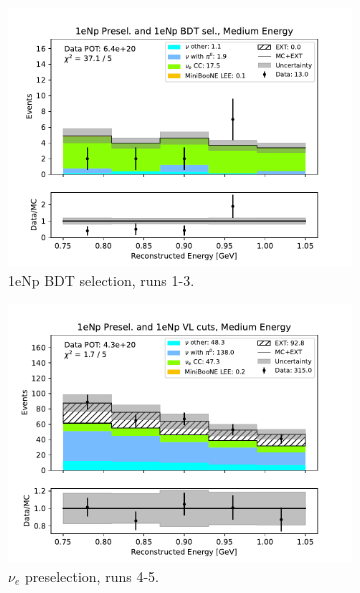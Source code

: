 \begin{figure}[H]
\begin{subfigure}{0.33\linewidth}
        \includegraphics[width=\linewidth]{technote/Sidebands/Figures/NearSideband/near_sideband_reco_e_run123_NP_NPBDT_MEDIUM_ENERGY.pdf}
        \caption{1eNp BDT selection, runs 1-3.}
    \end{subfigure}
    \begin{subfigure}{0.33\linewidth}
        \includegraphics[width=\linewidth]{technote/Sidebands/Figures/NearSideband/near_sideband_reco_e_run4b4c4d5_NP_NP_MEDIUM_ENERGY.pdf}
        \caption{$\nu_e$ preselection, runs 4-5.}
    \end{subfigure}%
    \begin{subfigure}{0.33\linewidth}

\end{subfigure}
\end{figure}
